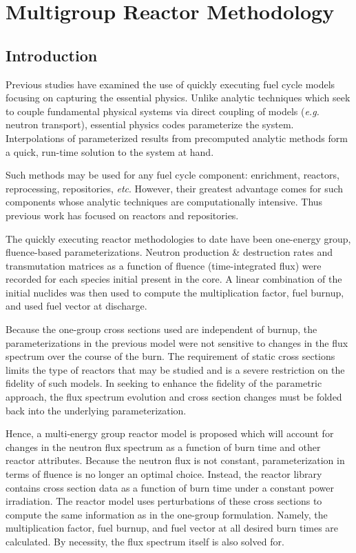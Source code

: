 \chapter{Multigroup Reactor Methodology}
\label{mg_paper}

\section{Introduction}
\label{mg_sec:intro}
Previous studies have examined the use of quickly executing fuel cycle models focusing on capturing 
the essential physics.  Unlike analytic techniques which seek to couple   
fundamental physical systems via direct coupling of models (\emph{e.g.} neutron transport), 
essential physics codes parameterize the system.   Interpolations
of parameterized results from precomputed analytic methods form a quick, run-time solution to the system at hand.

Such methods may be used for any fuel cycle component: enrichment, reactors, reprocessing, 
repositories, \emph{etc}.  However, their greatest advantage comes for such components whose analytic
techniques are computationally intensive.  Thus previous work has focused on reactors and repositories.

The quickly executing reactor methodologies to date have been one-energy group, fluence-based parameterizations.
Neutron production \& destruction rates and transmutation matrices as a function of fluence 
(time-integrated flux) were recorded for each species initial present in the core.  A linear combination of 
the initial nuclides was then used to compute the multiplication factor, fuel burnup, and used fuel 
vector at discharge.

Because the one-group cross sections used are independent of burnup,
the parameterizations in the previous model were not sensitive to changes in the flux spectrum over the 
course of the burn.  The requirement of static cross sections limits the type of reactors that may be 
studied and is a severe restriction on the fidelity of such models.  In seeking to enhance
the fidelity of the parametric approach, the flux spectrum evolution and 
cross section changes must be folded back into the underlying parameterization.

Hence, a multi-energy group reactor model is proposed which will account for changes in the neutron
flux spectrum as a function of burn time and other reactor attributes.  Because the neutron flux is not constant, 
parameterization in terms of fluence is no longer an optimal choice.  Instead, the reactor library 
contains cross section data as a function of burn time under a constant power irradiation.  The reactor model 
uses perturbations of these cross sections to compute the same information as in the one-group 
formulation.  Namely, the multiplication factor, fuel burnup, and fuel vector at all desired burn times
are calculated.  By necessity, the flux spectrum itself is also solved for.

